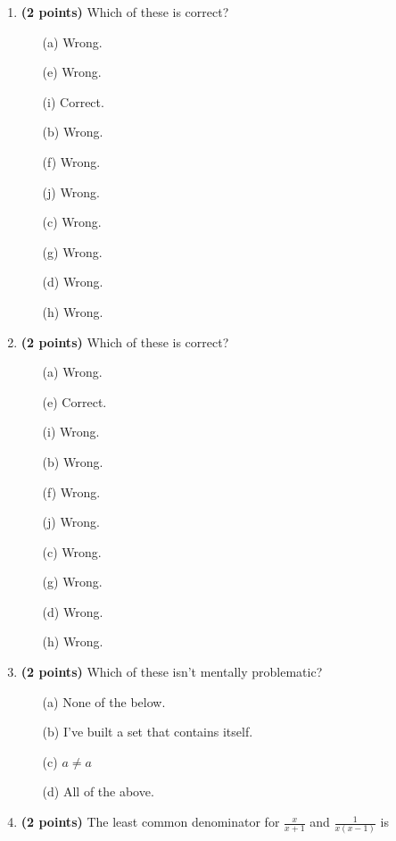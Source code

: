 \documentclass[12pt]{amsart}
\begin{document}
\newpage
\begin{enumerate}
\item {\bf (2 points)} 
 Which of these is correct?

\begin{minipage}[t]{1.0\linewidth}\begin{multicols}{4}\begin{itemize}\item[(a)]  Wrong. \item[(e)]  Wrong. \item[(i)]  Correct. \item[(b)]  Wrong. \item[(f)]  Wrong. \item[(j)]  Wrong. \item[(c)]  Wrong. \item[(g)]  Wrong. \item[] \item[(d)]  Wrong. \item[(h)]  Wrong. \item[] \end{itemize}\end{multicols}\end{minipage} \vfill 
\item {\bf (2 points)} 
 Which of these is correct?

\begin{minipage}[t]{1.0\linewidth}\begin{multicols}{4}\begin{itemize}\item[(a)]  Wrong. \item[(e)]  Correct. \item[(i)]  Wrong. \item[(b)]  Wrong. \item[(f)]  Wrong. \item[(j)]  Wrong. \item[(c)]  Wrong. \item[(g)]  Wrong. \item[] \item[(d)]  Wrong. \item[(h)]  Wrong. \item[] \end{itemize}\end{multicols}\end{minipage} \vfill 
\item {\bf (2 points)} 
 Which of these isn't mentally problematic?

\begin{minipage}[t]{1.0\linewidth}\begin{itemize}\item[(a)]  None of the below.  \item[(b)]  I've built a set that contains itself. \item[(c)]  $a \neq a$ \item[(d)]   All of the above. \end{itemize}\end{minipage} \vfill 
\item {\bf (2 points)} 
 The least common denominator for $\displaystyle \frac{x}{x+1}$ and $\displaystyle \frac{1}{x(x-1)}$ is \vspace{.2cm}


\end{enumerate}
\end{document}
